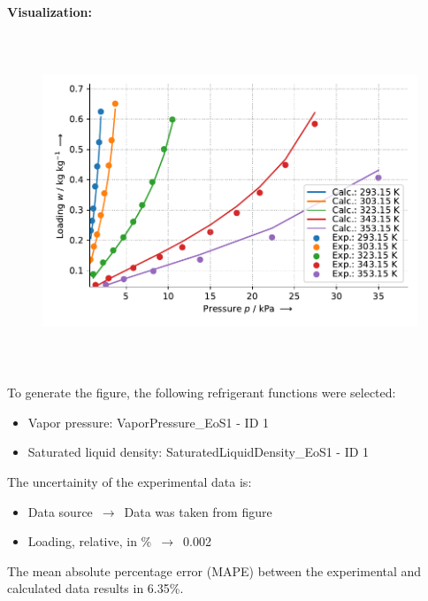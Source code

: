 \textbf{Visualization:}
%
\begin{figure}[!htp]
{\noindent\includegraphics[height=10cm, keepaspectratio]{figs/ads/ads_Water_polymer_PS-I_DubininAstakhov_1.pdf}}
\end{figure}
%

To generate the figure, the following refrigerant functions were selected:
\begin{itemize}
\item Vapor pressure: VaporPressure\_EoS1 - ID 1
\item Saturated liquid density: SaturatedLiquidDensity\_EoS1 - ID 1
\end{itemize}

The uncertainity of the experimental data is:
\begin{itemize}
\item Data source $\,\to\,$ Data was taken from figure
\item Loading, relative, in \% $\,\to\,$ 0.002
\end{itemize}

The mean absolute percentage error (MAPE) between the experimental and calculated data results in 6.35\%.
\FloatBarrier
\newpage
